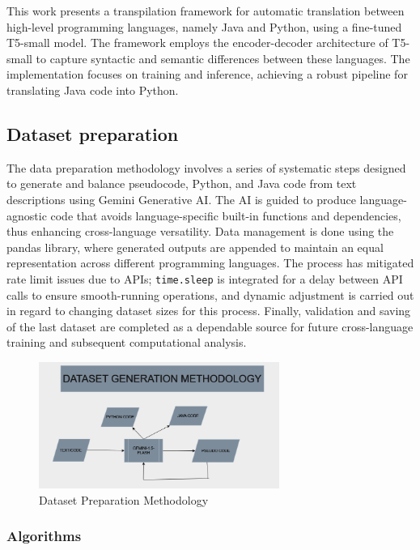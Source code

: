 \documentclass{dhbenelux}
\begin{document}
This work presents a transpilation framework for automatic translation between high-level programming languages, namely Java and Python, using a fine-tuned T5-small model. The framework employs the encoder-decoder architecture of T5-small to capture syntactic and semantic differences between these languages. The implementation focuses on training and inference, achieving a robust pipeline for translating Java code into Python.

\subsection{Dataset preparation}
The data preparation methodology involves a series of systematic steps designed to generate and balance pseudocode, Python, and Java code from text descriptions using Gemini Generative AI. The AI is guided to produce language-agnostic code that avoids language-specific built-in functions and dependencies, thus enhancing cross-language versatility. Data management is done using the pandas library, where generated outputs are appended to maintain an equal representation across different programming languages. The process has mitigated rate limit issues due to APIs; \texttt{time.sleep} is integrated for a delay between API calls to ensure smooth-running operations, and dynamic adjustment is carried out in regard to changing dataset sizes for this process. Finally, validation and saving of the last dataset are completed as a dependable source for future cross-language training and subsequent computational analysis.

\begin{figure}[h!]
\centering
\includegraphics[width=0.7\textwidth]{dataset_methodology.png} %
\caption{Dataset Preparation Methodology}
\label{fig:dataset-methodology}
\end{figure}

\subsubsection{Algorithms}
\end{document}
